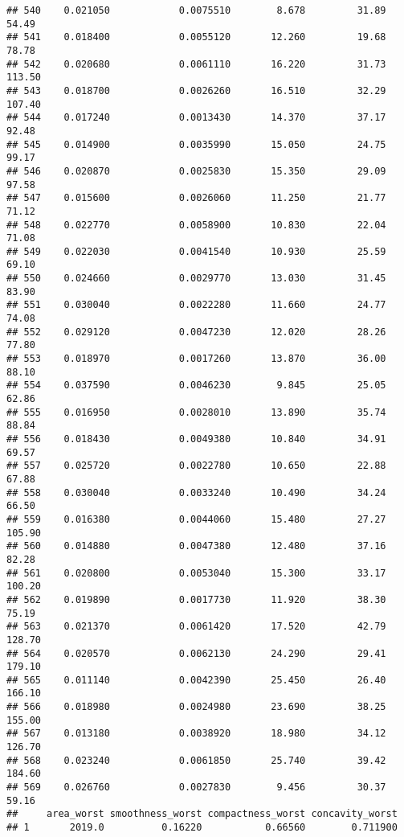 \documentclass[
]{article}
\begin{document}
\begin{verbatim}
## 540    0.021050            0.0075510        8.678         31.89           54.49
## 541    0.018400            0.0055120       12.260         19.68           78.78
## 542    0.020680            0.0061110       16.220         31.73          113.50
## 543    0.018700            0.0026260       16.510         32.29          107.40
## 544    0.017240            0.0013430       14.370         37.17           92.48
## 545    0.014900            0.0035990       15.050         24.75           99.17
## 546    0.020870            0.0025830       15.350         29.09           97.58
## 547    0.015600            0.0026060       11.250         21.77           71.12
## 548    0.022770            0.0058900       10.830         22.04           71.08
## 549    0.022030            0.0041540       10.930         25.59           69.10
## 550    0.024660            0.0029770       13.030         31.45           83.90
## 551    0.030040            0.0022280       11.660         24.77           74.08
## 552    0.029120            0.0047230       12.020         28.26           77.80
## 553    0.018970            0.0017260       13.870         36.00           88.10
## 554    0.037590            0.0046230        9.845         25.05           62.86
## 555    0.016950            0.0028010       13.890         35.74           88.84
## 556    0.018430            0.0049380       10.840         34.91           69.57
## 557    0.025720            0.0022780       10.650         22.88           67.88
## 558    0.030040            0.0033240       10.490         34.24           66.50
## 559    0.016380            0.0044060       15.480         27.27          105.90
## 560    0.014880            0.0047380       12.480         37.16           82.28
## 561    0.020800            0.0053040       15.300         33.17          100.20
## 562    0.019890            0.0017730       11.920         38.30           75.19
## 563    0.021370            0.0061420       17.520         42.79          128.70
## 564    0.020570            0.0062130       24.290         29.41          179.10
## 565    0.011140            0.0042390       25.450         26.40          166.10
## 566    0.018980            0.0024980       23.690         38.25          155.00
## 567    0.013180            0.0038920       18.980         34.12          126.70
## 568    0.023240            0.0061850       25.740         39.42          184.60
## 569    0.026760            0.0027830        9.456         30.37           59.16
##     area_worst smoothness_worst compactness_worst concavity_worst
## 1       2019.0          0.16220           0.66560        0.711900

\end{verbatim}
\end{document}
